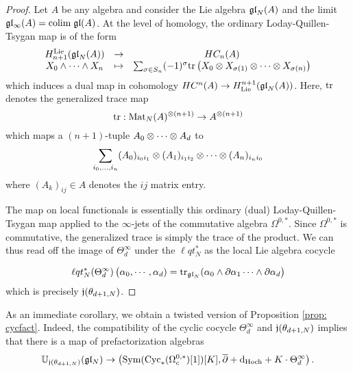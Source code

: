 \begin{proof}
Let $A$ be any algebra and consider the Lie algebra ${\mathfrak{gl}}_N(A)$ and the limit $\mathfrak{g} \mathfrak{l}_\infty(A) = {\rm colim} \; {\mathfrak{gl}} (A)$. 
At the level of homology, the ordinary Loday-Quillen-Tsygan map is of the form
\[
\begin{array}{ccc}
H_{n+1}^{\rm Lie}({\mathfrak{gl}}_N(A)) & \to & HC_{n}(A) \\
X_0 \wedge \cdots \wedge X_n & \mapsto & \sum_{\sigma \in S_n} (-1)^{\sigma} {\rm tr} \left(X_0 \otimes X_{\sigma(1)} \otimes\cdots \otimes X_{\sigma(n)} \right) 
\end{array}
\] 
which induces a dual map in cohomology $HC^n(A) \to H^{n+1}_{\rm Lie}({\mathfrak{gl}}_N(A))$. 
Here, ${\rm tr}$ denotes the generalized trace map
\[
{\rm tr} : {\rm Mat}_N(A)^{\otimes(n+1)} \to A^{\otimes (n+1)} 
\]
which maps a $(n+1)$-tuple $A_0\otimes \cdots \otimes A_d$ to 
\[
\sum_{i_0,\ldots,i_n} (A_0)_{i_0 i_1} \otimes (A_1)_{i_1i_2} \otimes \cdots \otimes (A_n)_{i_n i_0}
\]
where $(A_k)_{ij} \in A$ denotes the $ij$ matrix entry.

The map on local functionals is essentially this ordinary (dual) Loday-Quillen-Tsygan map applied to the $\infty$-jets of the commutative algebra $\Omega^{0,*}$. 
Since $\Omega^{0,*}$ is commutative, the generalized trace is simply the trace of the product.
We can thus read off the image of $\Theta^\infty_d$ under the $\ell q t_N^*$ as the local Lie algebra cocycle

\begin{align*}
\ell q t_N^*(\Theta_d^\infty)\left(\alpha_0, \cdots, \alpha_d) = {\rm tr}_{{\mathfrak{gl}}_N}(\alpha_0 \wedge \partial \alpha_1 \cdots \wedge \partial \alpha_d\right)
\end{align*}
which is precisely $\mathfrak j(\theta_{d+1,N})$. 
\end{proof}

As an immediate corollary, we obtain a twisted version of Proposition \ref{prop: cycfact}.
Indeed, the compatibility of the cyclic cocycle $\Theta^\infty_d$ and $\mathfrak j(\theta_{d+1,N})$ implies that there is a map of prefactorization algebras
\[
\mathbb U_{\mathfrak j(\theta_{d+1,N})} (\mathfrak{g} \mathfrak{l}_N) \to \left({\rm Sym}({\rm Cyc}_*(\Omega^{0,*}_c)[1])[K], \overline{\partial} + {\rm d}_{\rm Hoch} + K \cdot \Theta^\infty_d \right) .
\]

